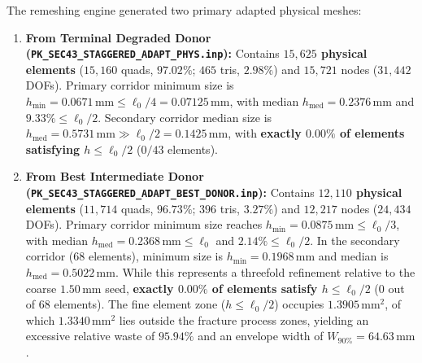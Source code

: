 The remeshing engine generated two primary adapted physical meshes:
\begin{enumerate}
  \item \textbf{From Terminal Degraded Donor (\texttt{PK\_SEC43\_STAGGERED\_ADAPT\_PHYS.inp}):} Contains \textbf{$15{,}625$ physical elements} ($15{,}160$ quads, $97.02\%$; $465$ tris, $2.98\%$) and $15{,}721$ nodes ($31{,}442$ DOFs). Primary corridor minimum size is $h_{\min} = 0.0671\,\mathrm{mm} \le \ell_0/4 = 0.07125\,\mathrm{mm}$, with median $h_{\mathrm{med}} = 0.2376\,\mathrm{mm}$ and $9.33\% \le \ell_0/2$. Secondary corridor median size is $h_{\mathrm{med}} = \mathbf{0.5731\,\mathrm{mm}} \gg \ell_0/2 = 0.1425\,\mathrm{mm}$, with \textbf{exactly $0.00\%$ of elements satisfying $h \le \ell_0/2$} ($0/43$ elements).
  \item \textbf{From Best Intermediate Donor (\texttt{PK\_SEC43\_STAGGERED\_ADAPT\_BEST\_DONOR.inp}):} Contains \textbf{$12{,}110$ physical elements} ($11{,}714$ quads, $96.73\%$; $396$ tris, $3.27\%$) and $12{,}217$ nodes ($24{,}434$ DOFs). Primary corridor minimum size reaches $h_{\min} = 0.0875\,\mathrm{mm} \le \ell_0/3$, with median $h_{\mathrm{med}} = 0.2368\,\mathrm{mm} \le \ell_0$ and $2.14\% \le \ell_0/2$. In the secondary corridor (68 elements), minimum size is $h_{\min} = 0.1968\,\mathrm{mm}$ and median is $h_{\mathrm{med}} = 0.5022\,\mathrm{mm}$. While this represents a threefold refinement relative to the coarse $1.50\,\mathrm{mm}$ seed, \textbf{exactly $0.00\%$ of elements satisfy $h \le \ell_0/2$} ($0$ out of $68$ elements). The fine element zone ($h \le \ell_0/2$) occupies $1.3905\,\mathrm{mm}^2$, of which $1.3340\,\mathrm{mm}^2$ lies outside the fracture process zones, yielding an excessive relative waste of $95.94\%$ and an envelope width of $W_{90\%} = 64.63\,\mathrm{mm}$.
\end{enumerate}

